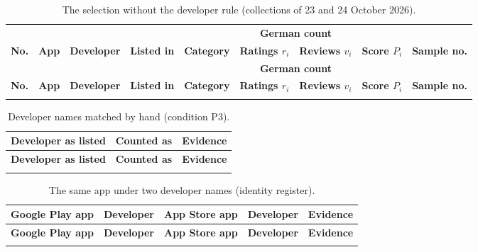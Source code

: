 \begin{landscape}
\begin{singlespace}
\setlength{\tabcolsep}{4pt}
\begin{longtable}{@{}r>{\raggedright\arraybackslash}p{4.4cm}>{\raggedright\arraybackslash}p{3.8cm}llrrrr@{}}
\caption{The selection without the developer rule (collections of 23 and 24
October 2026).}\label{tab:developer-rule}\\
\toprule
 & & & & & \multicolumn{2}{c}{\textbf{German count}} & & \\
\cmidrule(lr){6-7}
\textbf{No.} & \textbf{App} & \textbf{Developer} & \textbf{Listed in} & \textbf{Category} & \textbf{Ratings $r_i$} & \textbf{Reviews $v_i$} & \textbf{Score $P_i$} & \textbf{Sample no.} \\
\midrule
\endfirsthead
\toprule
 & & & & & \multicolumn{2}{c}{\textbf{German count}} & & \\
\cmidrule(lr){6-7}
\textbf{No.} & \textbf{App} & \textbf{Developer} & \textbf{Listed in} & \textbf{Category} & \textbf{Ratings $r_i$} & \textbf{Reviews $v_i$} & \textbf{Score $P_i$} & \textbf{Sample no.} \\
\midrule
\endhead
\bottomrule
\endfoot

\end{longtable}
\end{singlespace}
\end{landscape}

\begin{singlespace}
\small
\setlength{\tabcolsep}{4pt}
\begin{longtable}{@{}>{\raggedright\arraybackslash}p{3.9cm}>{\raggedright\arraybackslash}p{3.9cm}>{\raggedright\arraybackslash}p{5.9cm}@{}}
\caption{Developer names matched by hand (condition P3).}\label{tab:developer-aliases}\\
\toprule
\textbf{Developer as listed} & \textbf{Counted as} & \textbf{Evidence} \\
\midrule
\endfirsthead
\toprule
\textbf{Developer as listed} & \textbf{Counted as} & \textbf{Evidence} \\
\midrule
\endhead
\bottomrule
\endfoot

\end{longtable}
\end{singlespace}

\begin{singlespace}
\small
\setlength{\tabcolsep}{4pt}
\begin{longtable}{@{}>{\raggedright\arraybackslash}p{3.1cm}>{\raggedright\arraybackslash}p{2.7cm}>{\raggedright\arraybackslash}p{3.1cm}>{\raggedright\arraybackslash}p{2.7cm}>{\raggedright\arraybackslash}p{1.6cm}@{}}
\caption{The same app under two developer names (identity register).}\label{tab:identity-providers}\\
\toprule
\textbf{Google Play app} & \textbf{Developer} & \textbf{App Store app} & \textbf{Developer} & \textbf{Evidence} \\
\midrule
\endfirsthead
\toprule
\textbf{Google Play app} & \textbf{Developer} & \textbf{App Store app} & \textbf{Developer} & \textbf{Evidence} \\
\midrule
\endhead
\bottomrule
\endfoot

\end{longtable}
\end{singlespace}

